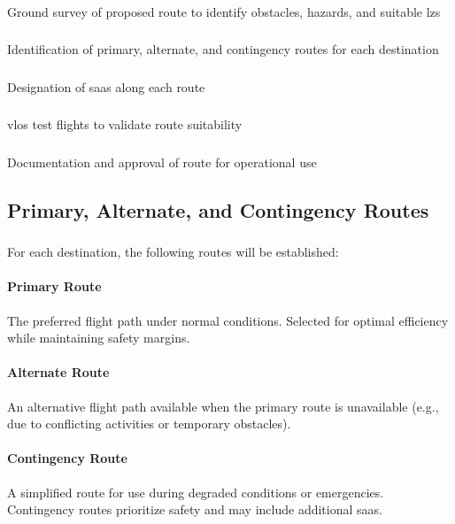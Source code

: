         \subsubsection{} Ground survey of proposed route to identify obstacles, hazards, and suitable \acp{lz}
        \subsubsection{} Identification of primary, alternate, and contingency routes for each destination
        \subsubsection{} Designation of \acp{saa} along each route
        \subsubsection{} \ac{vlos} test flights to validate route suitability
        \subsubsection{} Documentation and approval of route for operational use

    \subsection{Primary, Alternate, and Contingency Routes}\label{ssec:routeplanning}

        \subsubsection{} For each destination, the following routes will be established:

            \paragraph{Primary Route} The preferred flight path under normal conditions. Selected for optimal efficiency while maintaining safety margins.

            \paragraph{Alternate Route} An alternative flight path available when the primary route is unavailable (e.g., due to conflicting activities or temporary obstacles).

            \paragraph{Contingency Route} A simplified route for use during degraded conditions or emergencies. Contingency routes prioritize safety and may include additional \acp{saa}.

